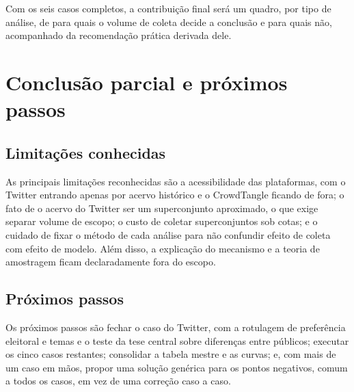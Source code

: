 \documentclass[12pt,a4paper]{article}
\begin{document}
Com os seis casos completos, a contribuição final será um quadro, por tipo de
análise, de para quais o volume de coleta decide a conclusão e para quais não,
acompanhado da recomendação prática derivada dele.

\section{Conclusão parcial e próximos passos}

\subsection{Limitações conhecidas}

As principais limitações reconhecidas são a acessibilidade das plataformas, com o
Twitter entrando apenas por acervo histórico e o CrowdTangle ficando de fora; o
fato de o acervo do Twitter ser um superconjunto aproximado, o que exige separar
volume de escopo; o custo de coletar superconjuntos sob cotas; e o cuidado de
fixar o método de cada análise para não confundir efeito de coleta com efeito de
modelo. Além disso, a explicação do mecanismo e a teoria de amostragem ficam
declaradamente fora do escopo.

\subsection{Próximos passos}

Os próximos passos são fechar o caso do Twitter, com a rotulagem de preferência
eleitoral e temas e o teste da tese central sobre diferenças entre públicos;
executar os cinco casos restantes; consolidar a tabela mestre e as curvas; e, com
mais de um caso em mãos, propor uma solução genérica para os pontos negativos,
comum a todos os casos, em vez de uma correção caso a caso.
\end{document}
